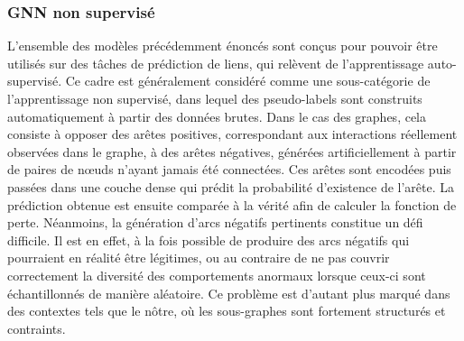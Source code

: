 \documentclass[a4paper,11pt,twoside]{StyleThese}
\begin{document}
\subsubsection{GNN non supervisé}
L'ensemble des modèles précédemment énoncés sont conçus pour pouvoir être utilisés sur des tâches de prédiction de liens, qui relèvent de l’apprentissage auto-supervisé. Ce cadre est généralement considéré comme une sous-catégorie de l’apprentissage non supervisé, dans lequel des pseudo-labels sont construits automatiquement à partir des données brutes. Dans le cas des graphes, cela consiste à opposer des arêtes positives, correspondant aux interactions réellement observées dans le graphe, à des arêtes négatives, générées artificiellement à partir de paires de nœuds n’ayant jamais été connectées. Ces arêtes sont encodées puis passées dans une couche dense qui prédit la probabilité d’existence de l’arête. La prédiction obtenue est ensuite comparée à la vérité afin de calculer la fonction de perte. Néanmoins, la génération d’arcs négatifs pertinents constitue un défi difficile. Il est en effet, à la fois possible de produire des arcs négatifs qui pourraient en réalité être légitimes, ou au contraire de ne pas couvrir correctement la diversité des comportements anormaux lorsque ceux-ci sont échantillonnés de manière aléatoire. Ce problème est d’autant plus marqué dans des contextes tels que le nôtre, où les sous-graphes sont fortement structurés et contraints.

\end{document}
